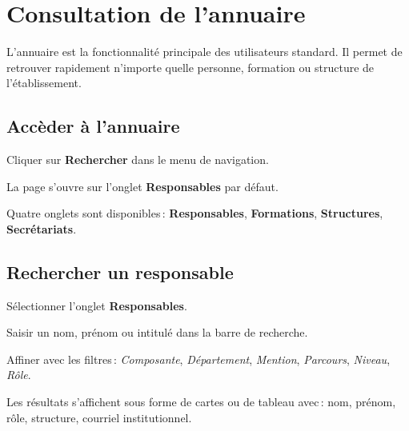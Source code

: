 
\section{Consultation de l'annuaire}

L'annuaire est la fonctionnalit\'e principale des utilisateurs standard. Il permet de retrouver rapidement n'importe quelle personne, formation ou structure de l'\'etablissement.

\subsection{Acc\`eder \`a l'annuaire}

\begin{steps}
  \item Cliquer sur \textbf{Rechercher} dans le menu de navigation.
  \item La page s'ouvre sur l'onglet \textbf{Responsables} par d\'efaut.
  \item Quatre onglets sont disponibles\,: \textbf{Responsables}, \textbf{Formations}, \textbf{Structures}, \textbf{Secr\'etariats}.
\end{steps}


\subsection{Rechercher un responsable}

\begin{steps}
  \item S\'electionner l'onglet \textbf{Responsables}.
  \item Saisir un nom, pr\'enom ou intitul\'e dans la barre de recherche.
  \item Affiner avec les filtres\,: \textit{Composante}, \textit{D\'epartement}, \textit{Mention}, \textit{Parcours}, \textit{Niveau}, \textit{R\^ole}.
  \item Les r\'esultats s'affichent sous forme de cartes ou de tableau avec\,: nom, pr\'enom, r\^ole, structure, courriel institutionnel.
\end{steps}

